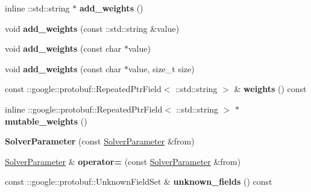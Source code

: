\begin{DoxyCompactItemize}
inline \+::std\+::string $\ast$ {\bfseries add\+\_\+weights} ()
\item 
\mbox{\label{classcaffe_1_1_solver_parameter_aa2513f70901162c985ba68aa94e58345}} 
void {\bfseries add\+\_\+weights} (const \+::std\+::string \&value)
\item 
\mbox{\label{classcaffe_1_1_solver_parameter_ac480a74a7b5b476da80b015efdfbe741}} 
void {\bfseries add\+\_\+weights} (const char $\ast$value)
\item 
\mbox{\label{classcaffe_1_1_solver_parameter_a8f504d3bf2b1092b44ffa515c2fdf332}} 
void {\bfseries add\+\_\+weights} (const char $\ast$value, size\+\_\+t size)
\item 
\mbox{\label{classcaffe_1_1_solver_parameter_ac55fa02a9d9a1107e025595c7136e78a}} 
const \+::google\+::protobuf\+::\+Repeated\+Ptr\+Field$<$ \+::std\+::string $>$ \& {\bfseries weights} () const
\item 
\mbox{\label{classcaffe_1_1_solver_parameter_ad9055b3a7ac024f6f7411668f7f95c4f}} 
inline \+::google\+::protobuf\+::\+Repeated\+Ptr\+Field$<$ \+::std\+::string $>$ $\ast$ {\bfseries mutable\+\_\+weights} ()
\item 
\mbox{\label{classcaffe_1_1_solver_parameter_a6bd1670742a6a93ca340afd8b9777c7c}} 
{\bfseries Solver\+Parameter} (const \mbox{\hyperlink{classcaffe_1_1_solver_parameter}{Solver\+Parameter}} \&from)
\item 
\mbox{\label{classcaffe_1_1_solver_parameter_a2a03c2c9244d2910378edde1a555ef43}} 
\mbox{\hyperlink{classcaffe_1_1_solver_parameter}{Solver\+Parameter}} \& {\bfseries operator=} (const \mbox{\hyperlink{classcaffe_1_1_solver_parameter}{Solver\+Parameter}} \&from)
\item 
\mbox{\label{classcaffe_1_1_solver_parameter_a2aa0d230fdb1a9bd1655715c972c4d52}} 
const \+::google\+::protobuf\+::\+Unknown\+Field\+Set \& {\bfseries unknown\+\_\+fields} () const
\item 

\end{DoxyCompactItemize}
